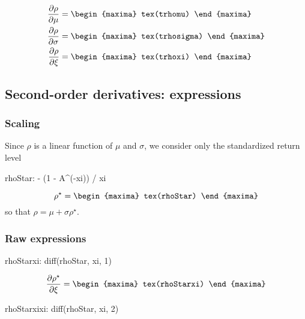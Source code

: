 {\color{MonVertF}
\begin{align*}
  \frac{\partial \rho}{\partial \mu}
  &=
  \begin{maxima}
    tex(trhomu)
  \end{maxima} \\
  \frac{\partial \rho}{\partial \sigma}
  &=
  \begin{maxima}
    tex(trhosigma)
  \end{maxima} \\
  \frac{\partial \rho}{\partial \xi}
  &=
  \begin{maxima}
    tex(trhoxi)
  \end{maxima}
\end{align*}
}

\subsection{Second-order derivatives: expressions}

\subsubsection*{Scaling}
Since $\rho$ is a linear function of $\mu$ and $\sigma$, we
consider only the standardized return level
\begin{maxima}
  rhoStar: - (1 - A^(-xi)) / xi
\end{maxima}
\[
\rho^\star=
\begin{maxima}
  tex(rhoStar)
\end{maxima}
\]
so that $\rho = \mu + \sigma \rho^\star$.

\subsubsection*{Raw expressions}
\begin{maxima}
  rhoStarxi:  diff(rhoStar, xi, 1)
\end{maxima}

{\color{MonVertF}
\[
\frac{\partial \rho^\star}{\partial \xi} = 
\begin{maxima}
  tex(rhoStarxi)
\end{maxima}
\]}


\begin{maxima}
  rhoStarxixi:  diff(rhoStar, xi, 2)
\end{maxima}

